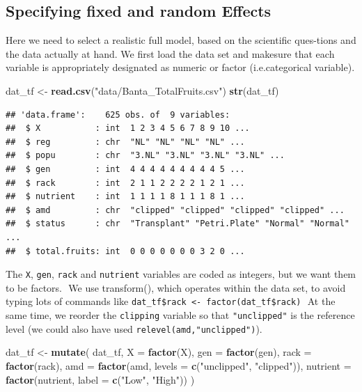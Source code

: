 \documentclass[
  12pt,
]{book}
\newenvironment{Shaded}{\begin{snugshade}}{\end{snugshade}}
\newcommand{\DataTypeTok}[1]{\textcolor[rgb]{0.13,0.29,0.53}{#1}}
\newcommand{\KeywordTok}[1]{\textcolor[rgb]{0.13,0.29,0.53}{\textbf{#1}}}
\newcommand{\NormalTok}[1]{#1}
\newcommand{\StringTok}[1]{\textcolor[rgb]{0.31,0.60,0.02}{#1}}
\begin{document}
\hypertarget{specifying-fixed-and-random-effects}{%
\subsection{Specifying fixed and random Effects}\label{specifying-fixed-and-random-effects}}

Here we need to select a realistic full model, based on the scientific ques-tions and the data actually at hand. We first load the data set and makesure that each variable is appropriately designated as numeric or factor (i.e.categorical variable).

\begin{Shaded}
\begin{Highlighting}[]
\NormalTok{dat_tf <-}\StringTok{ }\KeywordTok{read.csv}\NormalTok{(}\StringTok{"data/Banta_TotalFruits.csv"}\NormalTok{)}
\KeywordTok{str}\NormalTok{(dat_tf)}
\end{Highlighting}
\end{Shaded}

\begin{verbatim}
## 'data.frame':    625 obs. of  9 variables:
##  $ X           : int  1 2 3 4 5 6 7 8 9 10 ...
##  $ reg         : chr  "NL" "NL" "NL" "NL" ...
##  $ popu        : chr  "3.NL" "3.NL" "3.NL" "3.NL" ...
##  $ gen         : int  4 4 4 4 4 4 4 4 4 5 ...
##  $ rack        : int  2 1 1 2 2 2 2 1 2 1 ...
##  $ nutrient    : int  1 1 1 1 8 1 1 1 8 1 ...
##  $ amd         : chr  "clipped" "clipped" "clipped" "clipped" ...
##  $ status      : chr  "Transplant" "Petri.Plate" "Normal" "Normal" ...
##  $ total.fruits: int  0 0 0 0 0 0 0 3 2 0 ...
\end{verbatim}

The \texttt{X}, \texttt{gen}, \texttt{rack} and \texttt{nutrient} variables are coded as integers, but we want them to be factors.
 We use transform(), which operates within the data set, to avoid typing lots of commands like \texttt{dat\_tf\$rack\ \textless{}-\ factor(dat\_tf\$rack)}
 At the same time, we reorder the \texttt{clipping} variable so that \texttt{"unclipped"} is the reference level (we could also have used \texttt{relevel(amd,"unclipped")}).

\begin{Shaded}
\begin{Highlighting}[]
\NormalTok{dat_tf <-}\StringTok{ }\KeywordTok{mutate}\NormalTok{(}
\NormalTok{  dat_tf,}
  \DataTypeTok{X =} \KeywordTok{factor}\NormalTok{(X),}
  \DataTypeTok{gen =} \KeywordTok{factor}\NormalTok{(gen),}
  \DataTypeTok{rack =} \KeywordTok{factor}\NormalTok{(rack),}
  \DataTypeTok{amd =} \KeywordTok{factor}\NormalTok{(amd, }\DataTypeTok{levels =} \KeywordTok{c}\NormalTok{(}\StringTok{"unclipped"}\NormalTok{, }\StringTok{"clipped"}\NormalTok{)),}
  \DataTypeTok{nutrient =} \KeywordTok{factor}\NormalTok{(nutrient, }\DataTypeTok{label =} \KeywordTok{c}\NormalTok{(}\StringTok{"Low"}\NormalTok{, }\StringTok{"High"}\NormalTok{))}
\NormalTok{)}
\end{Highlighting}
\end{Shaded}
\end{document}
